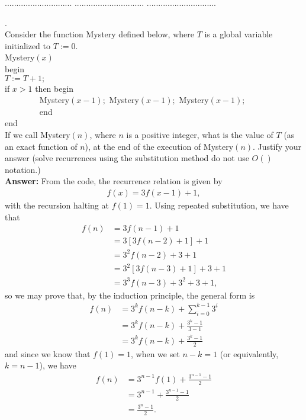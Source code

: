 \documentclass[a4paper,11pt]{article}
\begin{document}
\pagebreak


 $.............................$
 $..............................$
          $..............................$\\

\bigskip

.\\
Consider the function Mystery defined below, where $T$ is a global variable initialized to $T:=0$.\\
\noindent
Mystery$(x)$\\
begin\\
$T:=T+1;$\\
if $x > 1$ then begin\\
$~~~~~~~~~~~~~~~~~~~$Mystery$(x-1);$  Mystery$(x-1);$ Mystery$(x-1);$\\
$~~~~~~~~~~~~~~~~~~~$end\\
end\\
If we call Mystery$(n)$, where $n$ is a positive integer, what is the value of $T$ (as an exact function of $n$), 
at the end of the execution of  Mystery$(n)$. Justify your answer
(solve recurrences using the substitution method do not use $O()$ notation.)\\
{\bf Answer:}
From the code, the recurrence relation is given by
\begin{align*}
    f(x) = 3f(x - 1) + 1,
\end{align*}
with the recursion halting at $f(1) = 1$. Using repeated substitution, we have that
\begin{align*}
    f(n) &= 3f(n - 1) + 1 \\
    &= 3[3f(n - 2) + 1] + 1 \\
    &= 3^2f(n - 2) + 3 + 1 \\
    &= 3^2[3f(n - 3) + 1] + 3 + 1 \\
    &= 3^3f(n - 3) + 3^2 + 3 + 1,
\end{align*}
so we may prove that, by the induction principle, the general form is
\begin{align*}
    f(n) &= 3^kf(n - k) + \sum_{i = 0}^{k - 1} 3^i \\
    &= 3^kf(n - k) + \frac{3^k - 1}{3 - 1} \\
    &= 3^kf(n - k) + \frac{3^k - 1}{2}
\end{align*}
and since we know that $f(1) = 1$, when we set $n - k = 1$ (or equivalently, $k = n - 1$), we have
\begin{align*}
    f(n) &= 3^{n - 1} f(1) + \frac{3^{n - 1} - 1}{2} \\
    &= 3^{n - 1} + \frac{3^{n - 1} - 1}{2} \\
    &= \frac{3^n - 1}{2}.
\end{align*}
\end{document}
